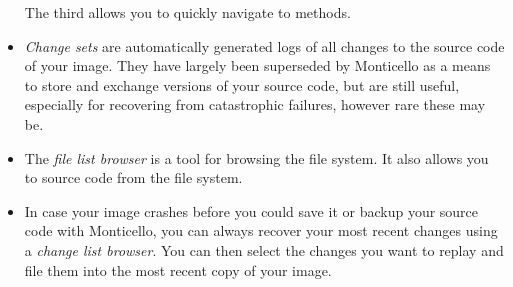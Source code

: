 \documentclass[a4paper,10pt,twoside]{book}
\begin{document}
\begin{itemize}
  The third allows you to quickly navigate to methods.
  \item \emph{Change sets} are automatically generated logs of all changes to the source code of your image.
  They have largely been superseded by Monticello as a means to store and exchange versions of your source code, but are still useful, especially for recovering from catastrophic failures, however rare these may be.
  \item The \emph{file list browser} is a tool for browsing the file system.
  It also allows you to  source code from the file system.
  \item In case your image crashes before you could save it or backup your source code with Monticello, you can always recover your most recent changes using a \emph{change list browser}.
  You can then select the changes you want to replay and file them into the most recent copy of your image.
\end{itemize}

\ifx\wholebook\relax\else
\end{document}
